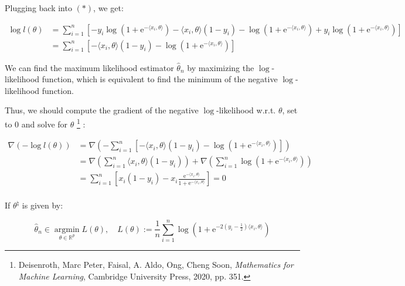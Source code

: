 \documentclass{article}
\begin{document}
Plugging back into $(*)$, we get:

\begin{equation*}
    \begin{split}
        \log l(\theta) 
        &= \sum_{i=1}^n \left[ -y_i \log \left( 1 + \mathrm{e}^{-\langle x_i, \theta \rangle} \right) - \langle x_i, \theta \rangle(1 - y_i) - \log \left( 1 + \mathrm{e}^{-\langle x_i, \theta \rangle} \right) + y_i \log \left( 1 + \mathrm{e}^{-\langle x_i, \theta \rangle} \right) \right] \\
        &= \sum_{i=1}^n \left[ - \langle x_i, \theta \rangle(1 - y_i) - \log \left( 1 + \mathrm{e}^{-\langle x_i, \theta \rangle} \right) \right]
    \end{split}
\end{equation*}

We can find the maximum likelihood estimator $\hat{\theta}_n$ by maximizing the $\log$-likelihood function,
which is equivalent to find the minimum of the negative $\log$-likelihood function.
\bigskip

Thus, we should compute the gradient of the negative $\log$-likelihood w.r.t. $\theta$, set to $0$ and solve for $\theta$
\footnote{Deisenroth, Marc Peter, Faisal, A. Aldo, Ong, Cheng Soon, \textit{Mathematics for Machine Learning}, Cambridge University Press, 2020, pp. 351.}
:

\begin{equation*}
    \begin{split}
        \nabla \left( - \log l(\theta) \right) 
        &= \nabla \left( - \sum_{i=1}^n \left[ - \langle x_i, \theta \rangle(1 - y_i) - \log \left( 1 + \mathrm{e}^{-\langle x_i, \theta \rangle} \right) \right] \right) \\
        &= \nabla \left( \sum_{i=1}^n \langle x_i, \theta \rangle(1 - y_i)\right) + \nabla \left(\sum_{i=1}^n\log \left( 1 + \mathrm{e}^{-\langle x_i, \theta \rangle} \right)\right) \\
        &= \sum_{i=1}^n \left[ x_i(1 - y_i) - x_i \frac{\mathrm{e}^{-\langle x_i, \theta \rangle}}{1 + \mathrm{e}^{-\langle x_i, \theta \rangle}} \right] = 0 \\
    \end{split}
\end{equation*}

If $\theta^\natural$ is given by:

\begin{equation*}
    \hat{\theta}_n \in \underset{\theta \in \mathbb{R}^p}{\operatorname{argmin}} L ( \theta ), \quad L (\theta) := \frac{1}{n} \sum_{i = 1}^n \log \left( 1 + \mathrm{e}^{-2(y_i - \frac{1}{2})\langle x_i, \theta \rangle} \right)
\end{equation*}
\end{document}
